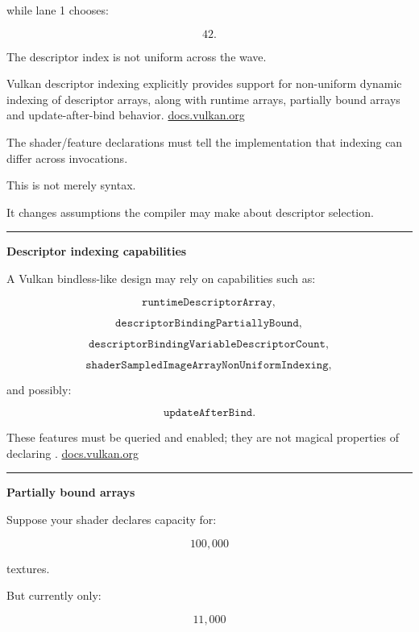 while lane 1 chooses:

\[
42.
\]

The descriptor index is not uniform across the wave.

Vulkan descriptor indexing explicitly provides support for non-uniform dynamic indexing of descriptor arrays, along with runtime arrays, partially bound arrays and update-after-bind behavior. \href{https://docs.vulkan.org/refpages/latest/refpages/source/VK_EXT_descriptor_indexing.html?utm_source=chatgpt.com}{docs.vulkan.org}

The shader/feature declarations must tell the implementation that indexing can differ across invocations.

This is not merely syntax.

It changes assumptions the compiler may make about descriptor selection.

\begin{center}\rule{0.5\linewidth}{0.5pt}\end{center}

\textbf{Descriptor indexing capabilities}

A Vulkan bindless-like design may rely on capabilities such as:

\[
\texttt{runtimeDescriptorArray},
\]

\[
\texttt{descriptorBindingPartiallyBound},
\]

\[
\texttt{descriptorBindingVariableDescriptorCount},
\]

\[
\texttt{shaderSampledImageArrayNonUniformIndexing},
\]

and possibly:

\[
\texttt{updateAfterBind}.
\]

These features must be queried and enabled; they are not magical properties of declaring . \href{https://docs.vulkan.org/guide/latest/extensions/VK_EXT_descriptor_indexing.html?utm_source=chatgpt.com}{docs.vulkan.org}

\begin{center}\rule{0.5\linewidth}{0.5pt}\end{center}

\textbf{Partially bound arrays}

Suppose your shader declares capacity for:

\[
100,000
\]

textures.

But currently only:

\[
11,000
\]

